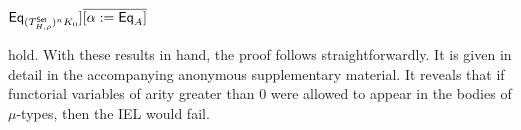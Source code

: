 \documentclass[runningheads]{llncs}
\newcommand{\set}{\mathsf{Set}}
\begin{document}
  \pagebreak

\noindent
$\Eq_{(T^\set_{H,\rho})^n K_0}] \overline{[\alpha := \Eq_A]}$
\begin{comment}
\[\begin{array}{ll}
&  \relsem{\Gamma; \Phi, \phi, \ol{\alpha} \vdash J} \Eq_{\rho} [\phi
  := T^{n}_{H,\Eq_{\rho}} K_0] \overline{[\alpha := \Eq_A]}\\
=  &
\relsem{\Gamma; \Phi, \phi,
  \ol{\alpha} \vdash J} \Eq_{\rho} [\phi := \Eq_{(T^\set_{H,\rho})^n K_0}]
\overline{[\alpha := \Eq_A]}
\end{array}\]
\end{comment}
hold. With these results in hand, the proof follows straightforwardly.
{\color{red} It is given in detail in the accompanying anonymous
  supplementary material.} It reveals that if functorial variables of
arity greater than $0$ were allowed to appear in the bodies of
$\mu$-types, then the IEL would fail.
\end{document}
